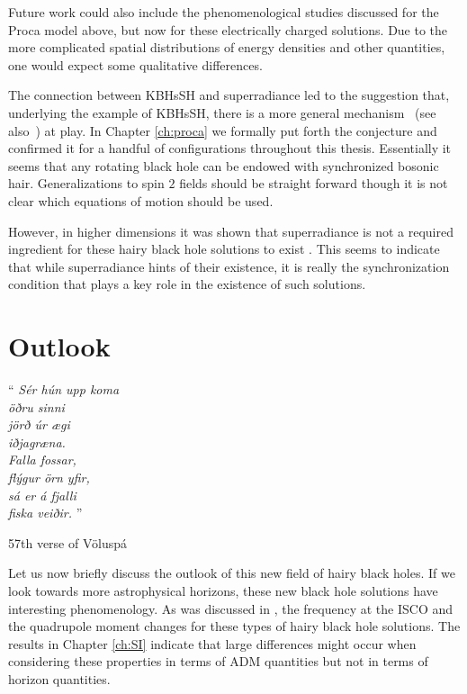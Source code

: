Future work could also include the phenomenological studies discussed for the Proca model above, but now for these electrically charged solutions.
Due to the more complicated spatial distributions of energy densities and other quantities, one would expect some qualitative differences.

\bigskip

The connection between KBHsSH and superradiance led to the suggestion that, underlying the example of KBHsSH, there is a more general mechanism~\cite{Herdeiro:2014goa,Herdeiro:2014ima} (see also~\cite{Herdeiro:2015waa,Herdeiro:2015gia}) at play.
In Chapter \ref{ch:proca} we formally put forth the conjecture and confirmed it for a handful of configurations throughout this thesis.
Essentially it seems that any rotating black hole can be endowed with synchronized bosonic hair.
Generalizations to spin $2$ fields should be straight forward though it is not clear which equations of motion should be used.

However, in higher dimensions it was shown that superradiance is not a required ingredient for these hairy black hole solutions to exist \cite{Brihaye:2014nba,Herdeiro:2015kha}.
This seems to indicate that while superradiance hints of their existence, it is really the synchronization condition that plays a key role in the existence of such solutions.

\chapter{Outlook}
\label{ch:outlook}

\epigraph{``\emph{
Sér hún upp koma \\
öðru sinni \\
jörð úr ægi \\
iðjagræna. \\
Falla fossar, \\
flýgur örn yfir, \\
sá er á fjalli \\
fiska veiðir. 
} 
''}{57th verse of Völuspá}

Let us now briefly discuss the outlook of this new field of hairy black holes.
If we look towards more astrophysical horizons, these new black hole solutions have interesting phenomenology.
As was discussed in \cite{Herdeiro:2014goa,Herdeiro:2015gia}, the frequency at the ISCO and the quadrupole moment changes for these types of hairy black hole solutions.
The results in Chapter \ref{ch:SI} indicate that large differences might occur when considering these properties in terms of ADM quantities but not in terms of horizon quantities.

